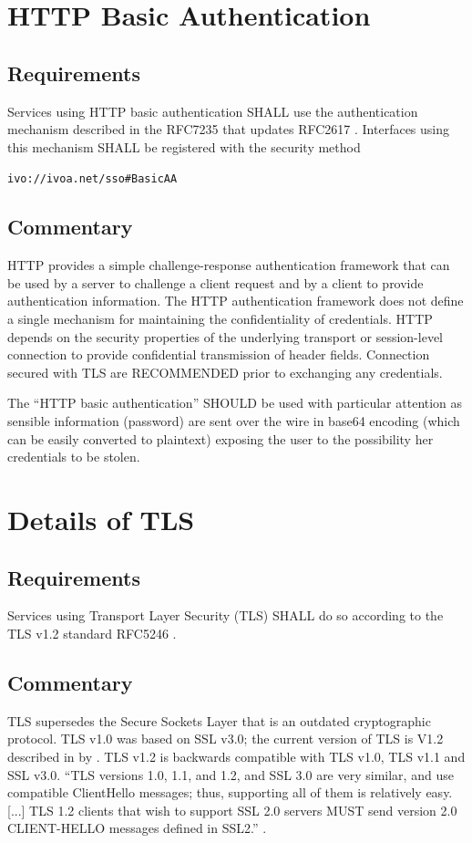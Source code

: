 \documentclass[11pt,a4paper]{ivoa}
\begin{document}
\section{HTTP Basic Authentication}
\subsection{Requirements}
Services using HTTP basic authentication SHALL use the authentication mechanism described in the RFC7235 \citep{std:RFC7235}
that updates RFC2617  \citep{std:RFC2617}. 
Interfaces using this mechanism SHALL be registered with the security method 

 \texttt{ivo://ivoa.net/sso\#BasicAA}

\subsection{Commentary}
HTTP provides a simple challenge-response authentication framework that can be used by a server to challenge 
a client request and by a   client to provide authentication information.
The HTTP authentication framework does not define a single mechanism for maintaining the confidentiality of credentials. 
HTTP depends on the security properties of the underlying transport  or session-level connection to provide 
confidential transmission of   header fields. Connection secured with TLS are RECOMMENDED prior to exchanging any credentials.

The ``HTTP basic authentication'' SHOULD be used with particular attention as sensible
information (password) are sent over the wire in base64 encoding (which can be easily converted to plaintext) exposing
the user to the possibility her credentials to be stolen.

\section{Details of TLS}
\subsection{Requirements}
Services using Transport Layer Security (TLS) SHALL do so according to the TLS v1.2 standard RFC5246 \citep{std:RFC5246}.

\subsection{Commentary}
TLS supersedes the Secure Sockets Layer that is an outdated cryptographic protocol.   
TLS v1.0 was based on SSL v3.0; the current version of TLS is V1.2 described in by \citet{std:RFC5246}.  
TLS v1.2 is backwards compatible with TLS v1.0, TLS v1.1 and SSL v3.0. 
``TLS versions 1.0, 1.1, and 1.2, and SSL 3.0 are very similar, and use compatible ClientHello messages; 
thus, supporting all of them is   relatively easy.[...] TLS 1.2 clients that wish to support SSL 2.0 servers MUST 
send  version 2.0 CLIENT-HELLO messages defined in SSL2.'' \citep{std:RFC5246}.
\end{document}

